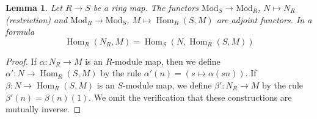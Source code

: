 \documentclass[10pt,a4paper]{amsart}
\theoremstyle{plain}
\newtheorem{lemma}[subsection]{Lemma}
\theoremstyle{definition}
\theoremstyle{remark}
\numberwithin{equation}{subsection}
\def\Hom{\mathop{\mathrm{Hom}}\nolimits}
\begin{document}
\begin{lemma}
\label{lemma-adjoint-hom-restrict}
Let $R \to S$ be a ring map. The functors
$\text{Mod}_S \to \text{Mod}_R$, $N \mapsto N_R$ (restriction)
and $\text{Mod}_R \to \text{Mod}_S$, $M \mapsto \Hom_R(S, M)$
are adjoint functors. In a formula
$$
\Hom_R(N_R, M) = \Hom_S(N, \Hom_R(S, M))
$$
\end{lemma}

\begin{proof}
If $\alpha : N_R \to M$ is an $R$-module map, then we define
$\alpha' : N \to \Hom_R(S, M)$ by the rule
$\alpha'(n) = (s \mapsto \alpha(sn))$. If $\beta : N \to \Hom_R(S, M)$
is an $S$-module map, we define $\beta' : N_R \to M$ by the rule
$\beta'(n) = \beta(n)(1)$.
We omit the verification that these constructions are mutually inverse.
\end{proof}
\end{document}
